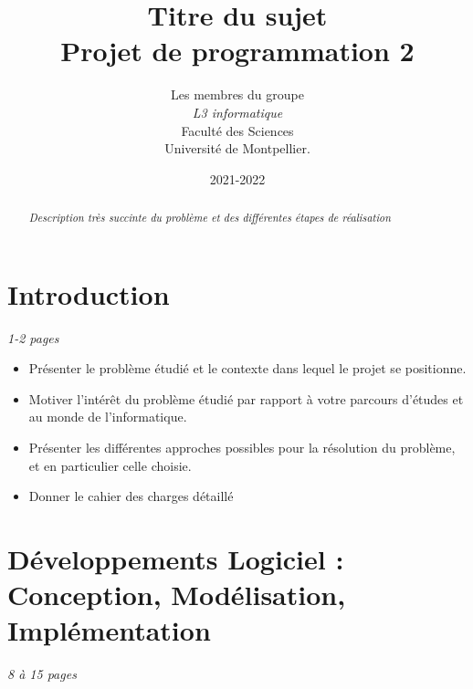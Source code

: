 \documentclass[a4paper]{article}
\title{  Titre du sujet\\         %
  Projet de programmation 2}
\author{ Les membres du groupe\\
  \emph{L3 informatique}\\
  Faculté des Sciences\\
Université de Montpellier.}
\date{2021-2022}
\begin{document}
\maketitle                    %


\begin{abstract}     %

  \emph{Description très succinte du problème et des différentes étapes de réalisation}

\end{abstract}
\newpage
\tableofcontents
\newpage
\section*{Introduction} %
\emph{1-2 pages}
\begin{itemize}%
\item Présenter le problème étudié et le contexte dans lequel le projet se positionne.
\item Motiver l'intérêt du problème étudié par rapport à votre parcours d'études et au monde de l'informatique.
\item	Présenter les différentes approches possibles pour la résolution du problème, et en particulier celle choisie.
\item Donner le cahier des charges détaillé
\end{itemize}


\section{Développements Logiciel : Conception, Modélisation, Implémentation} 
\emph{8 à 15 pages}
\end{document}
